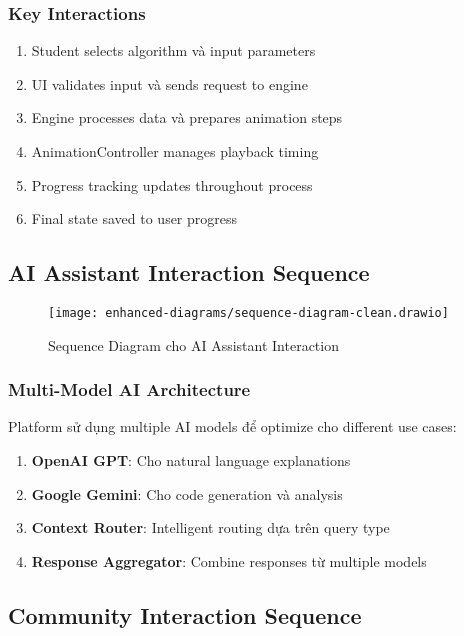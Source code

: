 \subsubsection{Key Interactions}

\begin{enumerate}
    \item Student selects algorithm và input parameters
    \item UI validates input và sends request to engine
    \item Engine processes data và prepares animation steps
    \item AnimationController manages playback timing
    \item Progress tracking updates throughout process
    \item Final state saved to user progress
\end{enumerate}

\subsection{AI Assistant Interaction Sequence}
\label{subsec:ai-sequence}

\begin{figure}[H]
\centering
\texttt{[image: enhanced-diagrams/sequence-diagram-clean.drawio]}
\caption{Sequence Diagram cho AI Assistant Interaction}
\label{fig:sequence-ai}
\end{figure}

\subsubsection{Multi-Model AI Architecture}

Platform sử dụng multiple AI models để optimize cho different use cases:

\begin{enumerate}
    \item \textbf{OpenAI GPT}: Cho natural language explanations
    \item \textbf{Google Gemini}: Cho code generation và analysis
    \item \textbf{Context Router}: Intelligent routing dựa trên query type
    \item \textbf{Response Aggregator}: Combine responses từ multiple models
\end{enumerate}

\subsection{Community Interaction Sequence}
\label{subsec:community-sequence}

